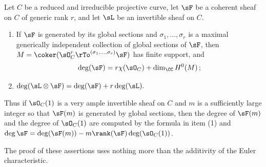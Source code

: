 \begin{fact} Let $C$ be a reduced and irreducible projective curve, let $\sF$ be a coherent sheaf on $C$ of generic rank $r$, and let $\sL$ be an invertible sheaf on $C$.
\begin{enumerate}
\item If $\sF$ is generated by its global sections and $\sigma_1,\dots, \sigma_r$ is a maximal generically independent
collection of global sections of $\sF$,  then $M = \coker(\sO_C^r \rTo^{(\sigma_1,\dots, \sigma_r)}\sF)$
has finite support, and
$$
\deg (\sF) = r \chi(\sO_C)+
\dim_\CC H^0(M)\,;
$$

\item $\deg (\sL \otimes \sF) = \deg (\sF) +r\deg (\sL).$

\end{enumerate}
Thus if $\sO_C(1)$ is a very ample invertible sheaf on $C$ and $m$ is a sufficiently large integer so that
$\sF(m)$ is generated by global sections, then the degree of $\sF(m)$ and the degree of $\sO_C(1)$ are computed by the formula in item (1)
and $\deg \sF = \deg(\sF(m)) - m \rank(\sF) \deg (\sO_C(1))$.

The proof of these assertions uses nothing more than the additivity of the Euler characteristic.
\end{fact}
%
%
%

